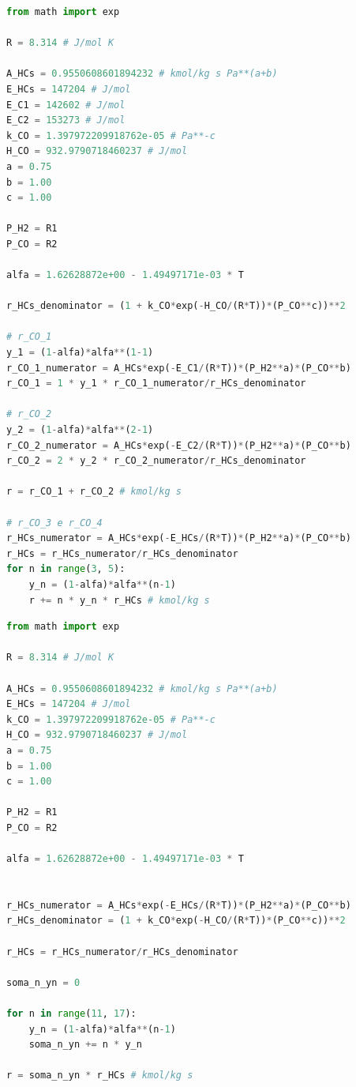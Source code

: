 \documentclass[portuguese,12pt,a4paper,onecolumn]{article}
\begin{document}
	\begin{lstlisting}[language=Python, caption=\textit{Script} do DWSIM (Python) para implementação da velocidade de consumo de \ce{CO} na geração de gases., label={lst:dwsim_gases}]
from math import exp

R = 8.314 # J/mol K

A_HCs = 0.9550608601894232 # kmol/kg s Pa**(a+b)
E_HCs = 147204 # J/mol
E_C1 = 142602 # J/mol
E_C2 = 153273 # J/mol
k_CO = 1.397972209918762e-05 # Pa**-c
H_CO = 932.9790718460237 # J/mol
a = 0.75
b = 1.00
c = 1.00

P_H2 = R1
P_CO = R2

alfa = 1.62628872e+00 - 1.49497171e-03 * T

r_HCs_denominator = (1 + k_CO*exp(-H_CO/(R*T))*(P_CO**c))**2

# r_CO_1
y_1 = (1-alfa)*alfa**(1-1)
r_CO_1_numerator = A_HCs*exp(-E_C1/(R*T))*(P_H2**a)*(P_CO**b)
r_CO_1 = 1 * y_1 * r_CO_1_numerator/r_HCs_denominator

# r_CO_2
y_2 = (1-alfa)*alfa**(2-1)
r_CO_2_numerator = A_HCs*exp(-E_C2/(R*T))*(P_H2**a)*(P_CO**b)
r_CO_2 = 2 * y_2 * r_CO_2_numerator/r_HCs_denominator

r = r_CO_1 + r_CO_2 # kmol/kg s

# r_CO_3 e r_CO_4
r_HCs_numerator = A_HCs*exp(-E_HCs/(R*T))*(P_H2**a)*(P_CO**b)
r_HCs = r_HCs_numerator/r_HCs_denominator
for n in range(3, 5):
	y_n = (1-alfa)*alfa**(n-1)
	r += n * y_n * r_HCs # kmol/kg s
	\end{lstlisting}
	
		\begin{lstlisting}[language=Python, caption=\textit{Script} do DWSIM (Python) para implementação da velocidade de consumo de \ce{CO} na geração de querosene., label={lst:dwsim_querosene}]
from math import exp

R = 8.314 # J/mol K

A_HCs = 0.9550608601894232 # kmol/kg s Pa**(a+b)
E_HCs = 147204 # J/mol
k_CO = 1.397972209918762e-05 # Pa**-c
H_CO = 932.9790718460237 # J/mol
a = 0.75
b = 1.00
c = 1.00

P_H2 = R1
P_CO = R2

alfa = 1.62628872e+00 - 1.49497171e-03 * T


r_HCs_numerator = A_HCs*exp(-E_HCs/(R*T))*(P_H2**a)*(P_CO**b)
r_HCs_denominator = (1 + k_CO*exp(-H_CO/(R*T))*(P_CO**c))**2

r_HCs = r_HCs_numerator/r_HCs_denominator

soma_n_yn = 0

for n in range(11, 17):
	y_n = (1-alfa)*alfa**(n-1)
	soma_n_yn += n * y_n

r = soma_n_yn * r_HCs # kmol/kg s
	\end{lstlisting}
	
\end{document}
